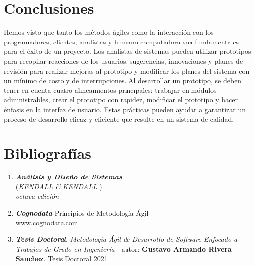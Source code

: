 \documentclass[12pt]{article}
\begin{document}
\newpage
\section{ Conclusiones }
\vspace{1cm}
\begin{center}
  \begin{minipage}{14cm}
    Hemos visto que tanto los métodos ágiles como la interacción con los programadores, clientes, analistas y humano-computadora son fundamentales para el éxito de un proyecto. Los analistas de sistemas pueden utilizar prototipos para recopilar reacciones de los usuarios, sugerencias, innovaciones y planes de revisión para realizar mejoras al prototipo y modificar los planes del sistema con un mínimo de costo y de interrupciones. Al desarrollar un prototipo, se deben tener en cuenta cuatro alineamientos principales: trabajar en módulos administrables, crear el prototipo con rapidez, modificar el prototipo y hacer énfasis en la interfaz de usuario. Estas prácticas pueden ayudar a garantizar un proceso de desarrollo eficaz y eficiente que resulte en un sistema de calidad.
  \end{minipage}
\end{center}

\newpage
\section{ Bibliografías }

\begin{enumerate}
  \item \textbf{ \textit{ Análisis y Diseño de Sistemas } }\\
  (\textit {KENDALL \& KENDALL })\\
  \textit{ octava edición }

  \item \textbf{ \textit{Cognodata}} Principios de Metodología Ágil \\ 
  \href{https://www.cognodata.com/principios-metodologia-agile-desarrollo-proyectos}{www.cognodata.com}

  \item \textbf{\textit{Tesis Doctoral}}, \textit{Metodología Ágil de Desarrollo de Software Enfocado a Trabajos de Grado en Ingeniería} - autor: \textbf{Gustavo Armando Rivera Sanchez}.
  \href{https://repository.unilibre.edu.co/bitstream/handle/10901/23827/Metodolog%C3%ADa%C3%81gilDeDesarrolloDeSoftwareEnfocadoATrabajosDeGradoEnIngenier%C3%ADa.pdf?sequence=2&isAllowed=y}{Tesis Doctoral 2021}

\end{enumerate}

\vspace{1cm}
\end{document}
